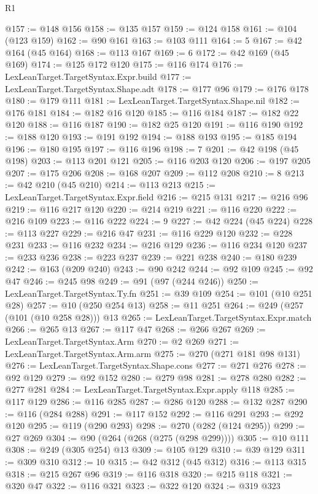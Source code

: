 \begin{lexlean}{R1}
\begin{coremodule}
@157 := @148 @156
@158 := @135 @157
@159 := @124 @158
@161 := @104 (@123 @159)
@162 := @90 @161
@163 := @103 @111
@164 := 5
@167 := @42 @164 (@45 @164)
@168 := @113 @167
@169 := 6
@172 := @42 @169 (@45 @169)
@174 := @125 @172 @120
@175 := @116 @174
@176 := LexLeanTarget.TargetSyntax.Expr.build
@177 := LexLeanTarget.TargetSyntax.Shape.adt
@178 := @177 @96
@179 := @176 @178
@180 := @179 @111
@181 := LexLeanTarget.TargetSyntax.Shape.nil
@182 := @176 @181
@184 := @182 @16 @120
@185 := @116 @184
@187 := @182 @22 @120
@188 := @116 @187
@190 := @182 @25 @120
@191 := @116 @190
@192 := @188 @120
@193 := @191 @192
@194 := @188 @193
@195 := @185 @194
@196 := @180 @195
@197 := @116 @196
@198 := 7
@201 := @42 @198 (@45 @198)
@203 := @113 @201 @121
@205 := @116 @203 @120
@206 := @197 @205
@207 := @175 @206
@208 := @168 @207
@209 := @112 @208
@210 := 8
@213 := @42 @210 (@45 @210)
@214 := @113 @213
@215 := LexLeanTarget.TargetSyntax.Expr.field
@216 := @215 @131
@217 := @216 @96
@219 := @116 @217 @120
@220 := @214 @219
@221 := @116 @220
@222 := @216 @109
@223 := @116 @222
@224 := 9
@227 := @42 @224 (@45 @224)
@228 := @113 @227
@229 := @216 @47
@231 := @116 @229 @120
@232 := @228 @231
@233 := @116 @232
@234 := @216 @129
@236 := @116 @234 @120
@237 := @233 @236
@238 := @223 @237
@239 := @221 @238
@240 := @180 @239
@242 := @163 (@209 @240)
@243 := @90 @242
@244 := @92 @109
@245 := @92 @47
@246 := @245 @98
@249 := @91 (@97 (@244 @246))
@250 := LexLeanTarget.TargetSyntax.Ty.fn
@251 := @39 @109
@254 := @101 (@10 @251 @28)
@257 := @10 (@250 @254 @13)
@258 := @11 @251
@264 := @249 (@257 (@101 (@10 @258 @28))) @13
@265 := LexLeanTarget.TargetSyntax.Expr.match
@266 := @265 @13
@267 := @117 @47
@268 := @266 @267
@269 := LexLeanTarget.TargetSyntax.Arm
@270 := @2 @269
@271 := LexLeanTarget.TargetSyntax.Arm.arm
@275 := @270 (@271 @181 @98 @131)
@276 := LexLeanTarget.TargetSyntax.Shape.cons
@277 := @271 @276
@278 := @92 @129
@279 := @92 @152
@280 := @279 @98
@281 := @278 @280
@282 := @277 @281
@284 := LexLeanTarget.TargetSyntax.Expr.apply @118
@285 := @117 @129
@286 := @116 @285
@287 := @286 @120
@288 := @132 @287
@290 := @116 (@284 @288)
@291 := @117 @152
@292 := @116 @291
@293 := @292 @120
@295 := @119 (@290 @293)
@298 := @270 (@282 (@124 @295))
@299 := @27 @269
@304 := @90 (@264 (@268 (@275 (@298 @299))))
@305 := @10 @111
@308 := @249 (@305 @254) @13
@309 := @105 @129
@310 := @39 @129
@311 := @309 @310
@312 := 10
@315 := @42 @312 (@45 @312)
@316 := @113 @315
@318 := @215 @267 @96
@319 := @116 @318
@320 := @215 @118
@321 := @320 @47
@322 := @116 @321
@323 := @322 @120
@324 := @319 @323

\end{coremodule}
\end{lexlean}

